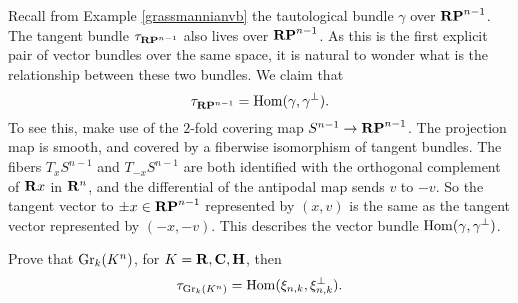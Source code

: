 \begin{example}
    Recall from Example \ref{grassmannianvb}  the tautological bundle
    $\gamma$ over $\mathbf{RP}^{n-1}$. The tangent
    bundle $\tau_{\mathbf{RP}^{n-1}}$ also lives over $\mathbf{RP}^{n-1}$. As this is the first
    explicit pair of vector bundles over the same space, it is natural to
    wonder what is the relationship between these two bundles.
    We claim that
    $$\tau_{\mathbf{RP}^{n-1}} = \operatorname{Hom}(\gamma,\gamma^\perp).$$
    To see this, make use of the $2$-fold covering map $S^{n-1}\to
    \mathbf{RP}^{n-1}$. The projection map is smooth, and covered by a fiberwise
isomorphism of tangent bundles. The fibers $T_xS^{n-1}$ and $T_{-x}S^{n-1}$
are both identified with the orthogonal complement of $\mathbf R x$ in $\mathbf R^n$,
and the differential of the antipodal map sends $v$ to $-v$. So the tangent
vector to $\pm x\in\mathbf{RP}^{n-1}$ represented by $(x,v)$ 
is the same as the tangent vector represented by $(-x,-v)$. This describes
the vector bundle $\operatorname{Hom}(\gamma,\gamma^\perp)$.
\end{example}
\begin{exercise}
    Prove that 
    $\mathrm{Gr}_k(K^n)$, for $K=\mathbf R,\mathbf C,\mathbf H$, then
    $$\tau_{\mathrm{Gr}_k(K^n)} = \operatorname{Hom}(\xi_{n,k},\xi_{n,k}^\perp).$$
\end{exercise}
